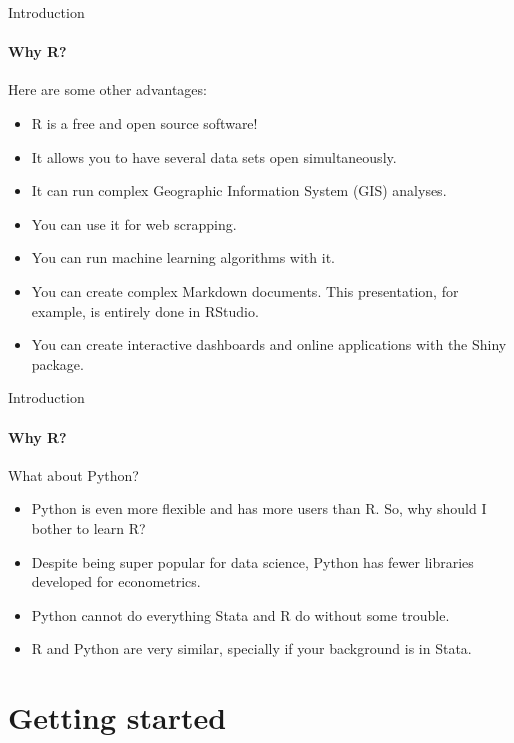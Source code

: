 \documentclass[ignorenonframetext,]{beamer}
\providecommand{\tightlist}{%
  \setlength{\itemsep}{0pt}\setlength{\parskip}{0pt}}
\begin{document}
\begin{frame}{Introduction}

\framesubtitle{Why R?}

Here are some other advantages:

\begin{itemize}
\item
  R is a free and open source software!
\item
  It allows you to have several data sets open simultaneously.
\item
  It can run complex Geographic Information System (GIS) analyses.
\item
  You can use it for web scrapping.
\item
  You can run machine learning algorithms with it.
\item
  You can create complex Markdown documents. This presentation, for
  example, is entirely done in RStudio.
\item
  You can create interactive dashboards and online applications with the
  Shiny package.
\end{itemize}

\end{frame}

\begin{frame}{Introduction}

\framesubtitle{Why R?}

What about Python?

\begin{itemize}
\tightlist
\item
  Python is even more flexible and has more users than R. So, why should
  I bother to learn R?
\item
  Despite being super popular for data science, Python has fewer
  libraries developed for econometrics.
\item
  Python cannot do everything Stata and R do without some trouble.
\item
  R and Python are very similar, specially if your background is in
  Stata.
\end{itemize}

\end{frame}

\section{Getting started}\label{getting-started}
\end{document}
